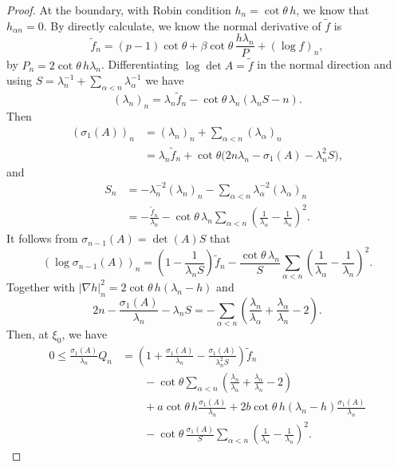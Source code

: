 \documentclass[11pt]{amsart}
\numberwithin{equation} {section}
\numberwithin{equation}{section}
\begin{document}
\begin{proof}
At the boundary, with Robin condition $h_n=\cot\theta\,h$, we know that $h_{\alpha n}=0$.
By directly calculate, we know the normal derivative of $\tilde{f}$ is 
\[
        \tilde f_n
        =(p-1)\cot\theta
        +\beta\cot\theta\,
        \frac{h\lambda_n}{P}
        +(\log f)_n,
\]
by $P_n=2\cot\theta\,h\lambda_n$. Differentiating
$\log\det A=\tilde f$ in the normal direction and using
$S=\lambda_n^{-1}+\sum_{\alpha<n}\lambda_{\alpha}^{-1}$ we have
\[
        (\lambda_n)_n
        =\lambda_n\tilde f_n
        -\cot\theta\,\lambda_n(\lambda_nS-n).
\]
Then
\[
\begin{split}
        (\sigma_1(A))_n
        &=(\lambda_n)_n+\sum_{\alpha<n}(\lambda_{\alpha})_n\\
        &=\lambda_n\tilde f_n
        +\cot\theta\bigl(2n\lambda_n-\sigma_1(A)-\lambda_n^2S\bigr),
\end{split}
\]
and
\[
\begin{split}
        S_n
        &=-\lambda_n^{-2}(\lambda_n)_n
        -\sum_{\alpha<n}\lambda_{\alpha}^{-2}(\lambda_{\alpha})_n\\
        &=-\frac{\tilde f_n}{\lambda_n}
        -\cot\theta\,\lambda_n
        \sum_{\alpha<n}\left(\frac1{\lambda_{\alpha}}
        -\frac1{\lambda_n}\right)^2.
\end{split}
\]
It follows from $\sigma_{n-1}(A)=\det(A)S$ that
\[
        (\log\sigma_{n-1}(A))_n
        =\left(1-\frac1{\lambda_nS}\right)\tilde f_n
        -\frac{\cot\theta\,\lambda_n}{S}
        \sum_{\alpha<n}\left(\frac1{\lambda_{\alpha}}
        -\frac1{\lambda_n}\right)^2.
\]
Together with $|\nabla h|^2_n=2\cot\theta\,h(\lambda_n-h)$ and
\[
        2n-\frac{\sigma_1(A)}{\lambda_n}-\lambda_nS
        =-\sum_{\alpha<n}\left(\frac{\lambda_n}{\lambda_{\alpha}}
        +\frac{\lambda_{\alpha}}{\lambda_n}-2\right). 
\]
Then, at $\xi_0$, we have
\begin{equation}\label{boundary Q derivative}
\begin{split}
        0\leq \frac{\sigma_1(A)}{\lambda_n}Q_n
        &=\left(1+\frac{\sigma_1(A)}{\lambda_n}
        -\frac{\sigma_1(A)}{\lambda_n^2S}\right)\tilde f_n\\
        &\qquad
        -\cot\theta
        \sum_{\alpha<n}\left(\frac{\lambda_n}{\lambda_{\alpha}}
        +\frac{\lambda_{\alpha}}{\lambda_n}-2\right)\\
        &\qquad
        +a\cot\theta\,h\frac{\sigma_1(A)}{\lambda_n}
        +2b\cot\theta\,h(\lambda_n-h)\frac{\sigma_1(A)}{\lambda_n}\\
        &\qquad
        -\cot\theta\,\frac{\sigma_1(A)}{S}
        \sum_{\alpha<n}\left(\frac1{\lambda_{\alpha}}
        -\frac1{\lambda_n}\right)^2.
\end{split}
\end{equation}


\end{proof}
\end{document}
